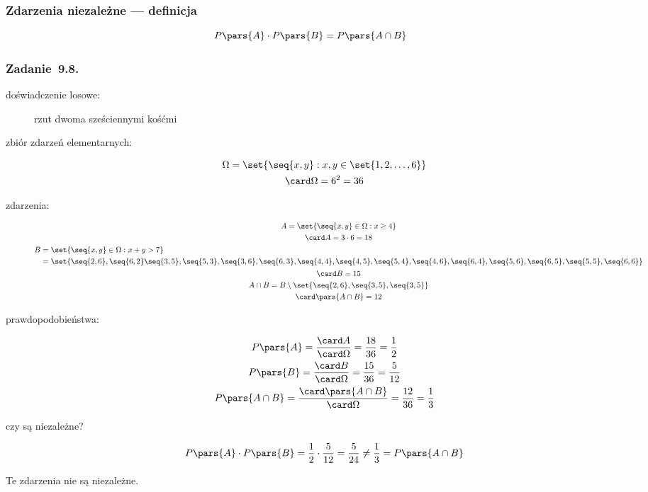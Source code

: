 \subsubsection*{Zdarzenia niezależne --- definicja}
\begin{equation*}
    P\pars{A} \cdot P\pars{B} = P\pars{A \cap B}
\end{equation*}
\subsubsection*{Zadanie~9.8.}
\begin{description}
    \item[doświadczenie losowe:] rzut dwoma sześciennymi kośćmi
    \item[zbiór zdarzeń elementarnych:]
        \begin{gather*}
            \Omega = \set{\seq{x, y} : x, y \in \set{1, 2, \ldots, 6}}\\
            \card\Omega = 6^2 = 36
        \end{gather*}
    \item[zdarzenia:]
        \begin{gather*}
            A = \set{\seq{x, y} \in \Omega : x \geq 4}\\
            \card A = 3 \cdot 6 = 18\\
            \begin{split}
                B &= \set{\seq{x, y} \in \Omega : x + y > 7}\\
                    &= \set{\seq{2, 6}, \seq{6, 2} \seq{3, 5}, \seq{5, 3}, \seq{3, 6}, \seq{6, 3}, \seq{4, 4}, \seq{4, 5}, \seq{5, 4}, \seq{4, 6}, \seq{6, 4}, \seq{5, 6}, \seq{6, 5}, \seq{5, 5}, \seq{6, 6}}
            \end{split}\\
            \card B = 15\\
            A \cap B = B \setminus \set{\seq{2, 6}, \seq{3, 5}, \seq{3, 5}}\\
            \card\pars{A \cap B} = 12
        \end{gather*}
    \item[prawdopodobieństwa:]
        \begin{gather*}
            P\pars{A} = \frac{\card A}{\card\Omega}
                = \frac{18}{36}
                = \frac{1}{2}\\
            P\pars{B} = \frac{\card B}{\card\Omega}
                = \frac{15}{36}
                = \frac{5}{12}\\
            P\pars{A \cap B}
                = \frac{\card\pars{A \cap B}}{\card\Omega}
                = \frac{12}{36}
                = \frac{1}{3}
        \end{gather*}
    \item[czy są niezależne?]
        \begin{equation*}
            P\pars{A} \cdot P\pars{B} = \frac{1}{2} \cdot \frac{5}{12}
                = \frac{5}{24}
                \neq \frac{1}{3}
                = P\pars{A \cap B}
        \end{equation*}
\end{description}
Te zdarzenia nie są niezależne.
